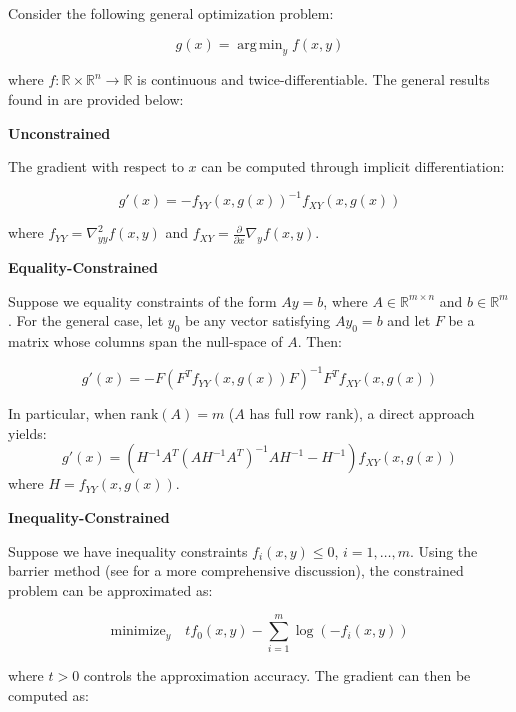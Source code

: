 \documentclass{article}
\DeclareMathOperator*{\argmin}{arg\,min}
\begin{document}
Consider the following general optimization problem: 

\begin{equation}
g(x) = \argmin_{y} f(x,y)
\end{equation}

where $f: \mathbb{R} \times \mathbb{R}^n \rightarrow \mathbb{R}$ is continuous and twice-differentiable. The general results found in \citet{gould2016differentiating} are provided below:

\textbf{Unconstrained} 

The gradient with respect to $x$ can be computed through implicit differentiation:

\begin{equation}
g'(x) = -f_{YY}(x,g(x))^{-1}f_{XY}(x,g(x))
\end{equation}

where $f_{YY} = \nabla^2_{yy}f(x,y)$ and $f_{XY} = \frac{\partial}{\partial x}\nabla_y f(x,y)$.

\textbf{Equality-Constrained}

Suppose we equality constraints of the form $Ay = b$, where $A \in \mathbb{R}^{m \times n}$ and $b \in \mathbb{R}^m$. For the general case, let $y_0$ be any vector satisfying $Ay_0 = b$ and let $F$ be a matrix whose columns span the null-space of $A$. Then:

\begin{equation}
g'(x) = -F(F^T f_{YY}(x,g(x))F)^{-1}F^T f_{XY}(x,g(x))
\end{equation}

In particular, when $\text{rank}(A) = m$ ($A$ has full row rank), a direct approach yields:
\begin{equation}
g'(x) = (H^{-1}A^T(AH^{-1}A^T)^{-1}AH^{-1} - H^{-1})f_{XY}(x,g(x))
\end{equation}
where $H = f_{YY}(x,g(x))$. 

\textbf{Inequality-Constrained}

Suppose we have inequality constraints $f_i(x,y) \leq 0$, $i=1,\ldots,m$. Using the barrier method (see \citet{boyd2004convex} for a more comprehensive discussion), the constrained problem can be approximated as:

\begin{equation}
\text{minimize}_y \quad tf_0(x,y) - \sum_{i=1}^m \log(-f_i(x,y))
\end{equation}

where $t > 0$ controls the approximation accuracy. The gradient can then be computed as:
\end{document}
